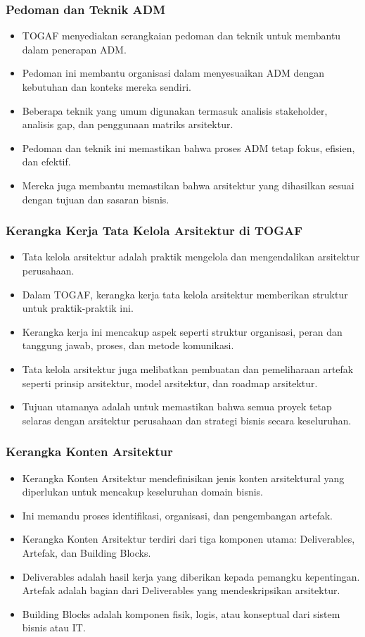 \documentclass[aspectratio=169]{beamer}
\begin{document}
	\begin{frame}
		\frametitle{Pedoman dan Teknik ADM}
		\begin{itemize}
			\item TOGAF menyediakan serangkaian pedoman dan teknik untuk membantu dalam penerapan ADM.
			\item Pedoman ini membantu organisasi dalam menyesuaikan ADM dengan kebutuhan dan konteks mereka sendiri.
			\item Beberapa teknik yang umum digunakan termasuk analisis stakeholder, analisis gap, dan penggunaan matriks arsitektur.
			\item Pedoman dan teknik ini memastikan bahwa proses ADM tetap fokus, efisien, dan efektif.
			\item Mereka juga membantu memastikan bahwa arsitektur yang dihasilkan sesuai dengan tujuan dan sasaran bisnis.
		\end{itemize}
	\end{frame}
	\begin{frame}
		\frametitle{Kerangka Kerja Tata Kelola Arsitektur di TOGAF}
		\begin{itemize}
			\item Tata kelola arsitektur adalah praktik mengelola dan mengendalikan arsitektur perusahaan.
			\item Dalam TOGAF, kerangka kerja tata kelola arsitektur memberikan struktur untuk praktik-praktik ini.
			\item Kerangka kerja ini mencakup aspek seperti struktur organisasi, peran dan tanggung jawab, proses, dan metode komunikasi.
			\item Tata kelola arsitektur juga melibatkan pembuatan dan pemeliharaan artefak seperti prinsip arsitektur, model arsitektur, dan roadmap arsitektur.
			\item Tujuan utamanya adalah untuk memastikan bahwa semua proyek tetap selaras dengan arsitektur perusahaan dan strategi bisnis secara keseluruhan.
		\end{itemize}
	\end{frame}
	
	\begin{frame}
		\frametitle{Kerangka Konten Arsitektur}
		\begin{itemize}
			\item Kerangka Konten Arsitektur mendefinisikan jenis konten arsitektural yang diperlukan untuk mencakup keseluruhan domain bisnis.
			\item Ini memandu proses identifikasi, organisasi, dan pengembangan artefak.
			\item Kerangka Konten Arsitektur terdiri dari tiga komponen utama: Deliverables, Artefak, dan Building Blocks.
			\item Deliverables adalah hasil kerja yang diberikan kepada pemangku kepentingan. Artefak adalah bagian dari Deliverables yang mendeskripsikan arsitektur.
			\item Building Blocks adalah komponen fisik, logis, atau konseptual dari sistem bisnis atau IT.
		\end{itemize}
	\end{frame}
	
\end{document}
